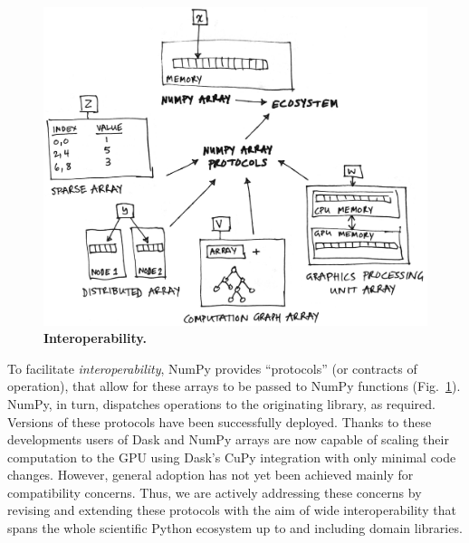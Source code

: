 \begin{figure}
  \centering
  \includegraphics[width=.45\textwidth]{static/sketches/duck-arrays}
  \caption{\textbf{Interoperability.} }\label{fig:duck-arrays}
\end{figure}

To facilitate \emph{interoperability}, NumPy provides
``protocols'' (or contracts of operation), that allow for these arrays to be
passed to NumPy functions (Fig.~\ref{fig:duck-arrays}).
NumPy, in turn, dispatches operations to the originating library, as required.
Versions of these protocols have been successfully deployed.
Thanks to these developments users of Dask and NumPy arrays are now capable
of scaling their computation to the GPU using Dask's CuPy integration with
only minimal code changes.
However, general adoption has not yet been achieved mainly for compatibility
concerns.
Thus, we are actively addressing these concerns by revising and extending
these protocols with the aim of wide interoperability that spans the whole
scientific Python ecosystem up to and including domain libraries.

